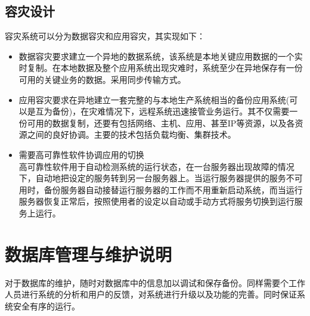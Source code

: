 \subsection{容灾设计}
容灾系统可以分为数据容灾和应用容灾，其实现如下：
\begin{itemize}
     
\item 数据容灾要求建立一个异地的数据系统，该系统是本地关键应用数据的一个实时复制。在本地数据及整个应用系统出现灾难时，系统至少在异地保存有一份可用的关键业务的数据。采用同步传输方式。

\item 应用容灾要求在异地建立一套完整的与本地生产系统相当的备份应用系统(可以是互为备份)，在灾难情况下，远程系统迅速接管业务运行。其不仅需要一份可用的数据复制，还要有包括网络、主机、应用、甚至IP等资源，以及各资源之间的良好协调。主要的技术包括负载均衡、集群技术。

\item 需要高可靠性软件协调应用的切换 \\
高可靠性软件用于自动检测系统的运行状态，在一台服务器出现故障的情况下，自动地把设定的服务转到另一台服务器上。当运行服务器提供的服务不可用时，备份服务器自动接替运行服务器的工作而不用重新启动系统，而当运行服务器恢复正常后，按照使用者的设定以自动或手动方式将服务切换到运行服务上运行。
\end{itemize}
\section{数据库管理与维护说明}
对于数据库的维护，随时对数据库中的信息加以调试和保存备份。同样需要个工作人员进行系统的分析和用户的反馈，对系统进行升级以及功能的完善。同时保证系统安全有序的运行。